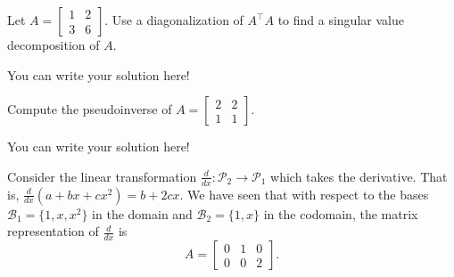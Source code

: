 \documentclass[]{exam}
\begin{document}
\begin{questions}
\begin{parts}
	\end{parts}

\question Let $A = \begin{bmatrix}
1 & 2 \\ 3 & 6
\end{bmatrix}$. Use a diagonalization of \(A^\intercal A\) to find a singular value decomposition of $A$.

\begin{solution}
	You can write your solution here!
\end{solution}

\question Compute the pseudoinverse of $A = \begin{bmatrix}
2 & 2\\ 1 &1
\end{bmatrix}$.

\begin{solution}
	You can write your solution here!
\end{solution}

\question Consider the linear transformation $\frac{d}{dx}\colon\mathcal{P}_2\to\mathcal{P}_1$ which takes the derivative. 
That is, $\frac{d}{dx}(a+bx+cx^2) = b+2cx$.
We have seen that with respect to the bases $\mathcal{B}_1= \{1,x,x^2\}$ in the domain and $\mathcal{B}_2=\{1,x\}$ in the codomain, the matrix representation of $\frac{d}{dx}$ is
\[ A = \begin{bmatrix}0&1&0\\0&0&2\end{bmatrix}. \]

\end{questions}
\end{document}
